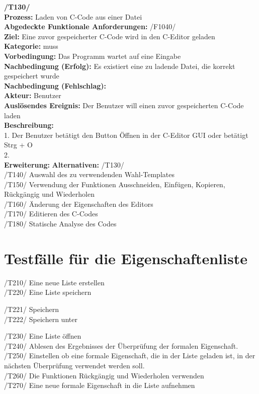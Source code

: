 \documentclass[a4paper]{scrreprt}
\begin{document}
\textbf{/T130/} \\
\textbf{Prozess: }Laden von C-Code aus einer Datei  \\
\textbf{Abgedeckte Funktionale Anforderungen:} /F1040/\\
\textbf{Ziel:} Eine zuvor gespeicherter C-Code wird in den C-Editor geladen\\
\textbf{Kategorie:} muss\\
\textbf{Vorbedingung:} Das Programm wartet auf eine Eingabe\\
\textbf{Nachbedingung (Erfolg):} Es existiert eine zu ladende Datei, die korrekt gespeichert wurde\\
\textbf{Nachbedingung (Fehlschlag):}\\
\textbf{Akteur:} Benutzer\\
\textbf{Auslösendes Ereignis:} Der Benutzer will einen zuvor gespeicherten C-Code laden \\
\textbf{Beschreibung:} \\
1. Der Benutzer betätigt den Button Öffnen in der C-Editor GUI oder betätigt Strg + O\\
2. \\
\textbf {Erweiterung:}
\textbf {Alternativen:}
/T130/ \\
/T140/ Auswahl des zu verwendenden Wahl-Templates \\
/T150/ Verwendung der Funktionen Ausschneiden, Einfügen, Kopieren, Rückgängig und Wiederholen \\
/T160/ Änderung der Eigenschaften des Editors \\
/T170/ Editieren des C-Codes \\
/T180/ Statische Analyse des Codes \\

\section{Testfälle für die Eigenschaftenliste}
/T210/ Eine neue Liste erstellen \\
/T220/ Eine Liste speichern 
\begin{addmargin}[25pt]{0pt} 
/T221/ Speichern \\
/T222/ Speichern unter
\end{addmargin}
/T230/ Eine Liste öffnen \\
/T240/ Ablesen des Ergebnisses der Überprüfung der formalen Eigenschaft. \\
/T250/ Einstellen ob eine formale Eigenschaft, die in der Liste geladen ist, in der \\ nächsten Überprüfung verwendet werden soll. \\
/T260/ Die Funktionen Rückgängig und Wiederholen verwenden \\
/T270/ Eine neue formale Eigenschaft in die Liste aufnehmen \\
\end{document}
